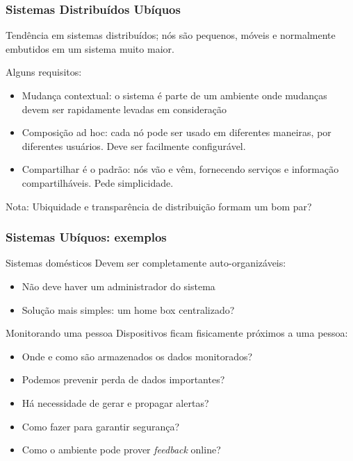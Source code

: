 \documentclass[Ligatures=TeX,table,brazil,svgnames,usetotalslideindicator,compress,10pt]{beamer}
\begin{document}
\begin{frame}
  \frametitle{Sistemas Distribuídos Ubíquos}

    Tendência em sistemas distribuídos; nós são pequenos, móveis e
    normalmente embutidos em um sistema muito maior.


  \begin{block}{Alguns requisitos:}
    \begin{itemize}
    \item \alert{Mudança contextual}: o sistema é parte de um ambiente onde mudanças devem ser rapidamente levadas em consideração
    \item \alert{Composição ad hoc}:  cada nó pode ser usado em diferentes maneiras, por diferentes usuários. Deve ser facilmente configurável.
    \item \alert{Compartilhar é o padrão}: nós vão e vêm, fornecendo serviços e informação compartilháveis. Pede simplicidade.
    \end{itemize}
  \end{block}

  \pause
  \begin{alertblock}{Nota:}
    Ubiquidade e transparência de distribuição formam um bom par?
  \end{alertblock}

\end{frame}

\begin{frame}
  \frametitle{Sistemas Ubíquos: exemplos}
  \begin{block}{Sistemas domésticos}
    Devem ser completamente auto-organizáveis:
    \begin{itemize}
    \item Não deve haver um administrador do sistema
    \item Solução mais simples: um \alert{home box} centralizado?
    \end{itemize}
  \end{block}

  \pause
  \begin{block}{Monitorando uma pessoa}
    Dispositivos ficam fisicamente próximos a uma pessoa:
    \begin{itemize}
    \item Onde e como são armazenados os dados monitorados?
    \item Podemos prevenir perda de dados importantes?
    \item Há necessidade de gerar e propagar alertas?
    \item Como fazer para garantir segurança?
    \item Como o ambiente pode prover \textit{feedback} online?
    \end{itemize}
  \end{block}
\end{frame}
\end{document}
